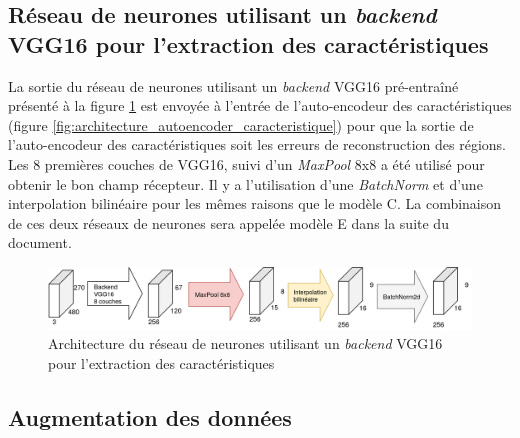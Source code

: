 \subsection{Réseau de neurones utilisant un \textit{backend} VGG16 pour l'extraction des caractéristiques}
    La sortie du réseau de neurones utilisant un \textit{backend} VGG16 pré-entraîné présenté à la figure \ref{fig:architecture_vgg16} est envoyée à l'entrée de l'auto-encodeur des caractéristiques (figure \ref{fig:architecture_autoencoder_caracteristique}) pour que la sortie de l'auto-encodeur des caractéristiques soit les erreurs de reconstruction des régions. Les 8 premières couches de VGG16, suivi d'un \textit{MaxPool} 8x8 a été utilisé pour obtenir le bon champ récepteur. Il y a l'utilisation d'une \textit{BatchNorm} et d'une interpolation bilinéaire pour les mêmes raisons que le modèle C. La combinaison de ces deux réseaux de neurones sera appelée modèle E dans la suite du document.
    \begin{figure}[H]
        \centering
        \includegraphics[width=15cm]{images/Architecture_Vgg16BackendAutoencoder.png}
        \caption{Architecture du réseau de neurones utilisant un \textit{backend} VGG16 pour l'extraction des caractéristiques}
        \label{fig:architecture_vgg16}
    \end{figure}

\subsection{Augmentation des données}
    